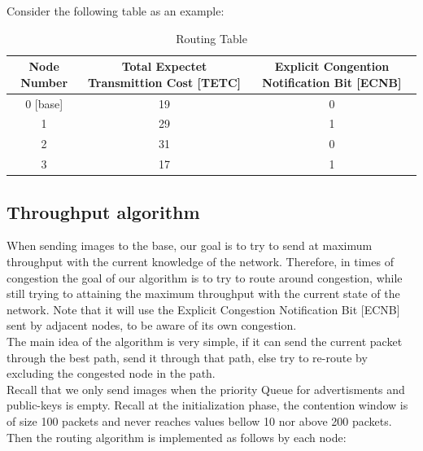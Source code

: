 \documentclass[letterpaper]{article}
\begin{document}
Consider the following table as an example:

\begin{table}[ht]
\caption{Routing Table} %
\centering %
\begin{tabular}{c c c} %
\hline
\hline %
Node Number & Total Expectet Transmittion Cost [TETC] & Explicit Congention Notification Bit [ECNB]  \\[0.5ex] %
\hline %
0 [base] & 19 & 0\\
1 & 29 & 1\\
2 & 31 & 0 \\
3 & 17 & 1\\ [1ex]
\hline
\end{tabular}
\label{table:nonlin}
\end{table}

\subsection{Throughput algorithm}

When sending images to the base, our goal is to try to send at maximum throughput with the current knowledge
of the network. Therefore, in times of congestion the goal of our algorithm is to try to route around 
congestion, while still trying to attaining the maximum throughput with the current state of the network. 
Note that it will use the Explicit Congestion Notification Bit [ECNB] sent by adjacent nodes, to be aware of 
its own congestion.\\ 

The main idea of the algorithm is very simple, if it can send the current packet through the best path, send 
it through that path, else try to re-route by excluding the congested node in the path.\\
 
Recall that we only send images when the priority Queue for advertisments and public-keys is empty. Recall at the initialization phase, the contention window is of size 100 packets and never reaches values bellow 10 nor above 200 packets. Then the routing algorithm is implemented as follows by each node:
\end{document}
